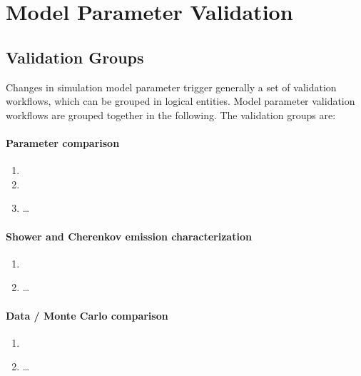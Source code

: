 \section{Model Parameter Validation}
\label{sect:ModelParameterValidation}

\subsection{Validation Groups}

Changes in simulation model parameter trigger generally a set of validation workflows, which can be grouped in logical entities. 
Model parameter validation workflows are grouped together in the following.
The validation groups are:

\paragraph{Parameter comparison} \label{validationGroup:ModelParameterComparison}
    \begin{enumerate}
        \item {}
        \item {}
        \item \dots
    \end{enumerate}
    
\paragraph{Shower and Cherenkov emission characterization} \label{validationGroup:ReferenceModelComparison}
    \begin{enumerate}
        \item {}
        \item \dots
    \end{enumerate}
    
\paragraph{Data / Monte Carlo comparison} \label{validationGroup:DataMonteCarloComparison}
    \begin{enumerate}
        \item {}
        \item \dots
    \end{enumerate}

